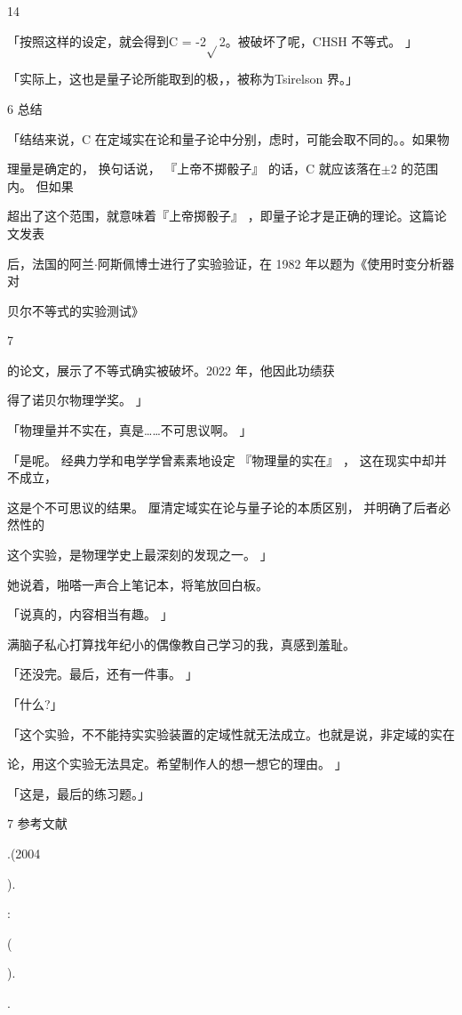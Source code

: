 14\par
「按照这样的设定，就会得到C = -2$\sqrt{}$2。被破坏了呢，CHSH 不等式。 」\par
「实际上，这也是量子论所能取到的极，，被称为Tsirelson 界。」\par
6 总结\par
「结结来说，C 在定域实在论和量子论中分别，虑时，可能会取不同的。。如果物\par
理量是确定的， 换句话说， 『上帝不掷骰子』 的话，C 就应该落在$\pm$2 的范围内。 但如果\par
超出了这个范围，就意味着『上帝掷骰子』 ，即量子论才是正确的理论。这篇论文发表\par
后，法国的阿兰$\cdot$阿斯佩博士进行了实验验证，在 1982 年以题为《使用时变分析器对\par
贝尔不等式的实验测试》\par
7\par
的论文，展示了不等式确实被破坏。2022 年，他因此功绩获\par
得了诺贝尔物理学奖。 」\par
「物理量并不实在，真是……不可思议啊。 」\par
「是呢。 经典力学和电学学曾素素地设定 『物理量的实在』 ， 这在现实中却并不成立，\par
这是个不可思议的结果。 厘清定域实在论与量子论的本质区别， 并明确了后者必然性的\par
这个实验，是物理学史上最深刻的发现之一。 」\par
她说着，啪嗒一声合上笔记本，将笔放回白板。\par
「说真的，内容相当有趣。 」\par
满脑子私心打算找年纪小的偶像教自己学习的我，真感到羞耻。\par
「还没完。最后，还有一件事。 」\par
「什么?」\par
「这个实验，不不能持实实验装置的定域性就无法成立。也就是说，非定域的实在\par
论，用这个实验无法具定。希望制作人的想一想它的理由。 」\par
「这是，最后的练习题。」\par
7 参考文献\par
[1]\par
.(2004\par
).\par
:\par
(\par
).\par
.\par
[2]\par
